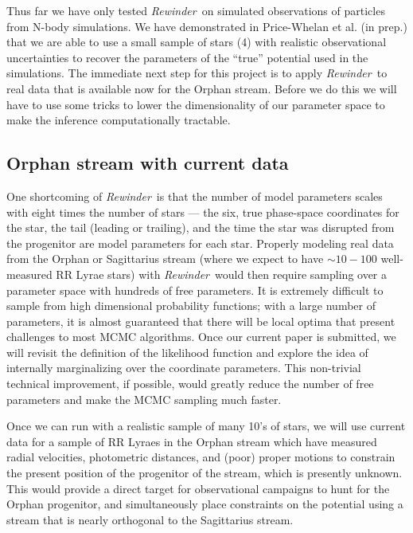 \documentclass[letterpaper,12pt,preprint]{aastex}
\newcommand{\rewinder}{\emph{Rewinder}}
\begin{document}
Thus far we have only tested \rewinder\ on simulated observations of particles from N-body simulations. We have demonstrated in Price-Whelan et al. (in prep.) that we are able to use a small sample of stars (4) with realistic observational uncertainties to recover the parameters of the ``true'' potential used in the simulations. The immediate next step for this project is to apply \rewinder\ to real data that is available now for the Orphan stream. Before we do this we will have to use some tricks to lower the dimensionality of our parameter space to make the inference computationally tractable.

\subsection{Orphan stream with current data}

One shortcoming of \rewinder\ is that the number of model parameters scales with eight times the number of stars --- the six, true phase-space coordinates for the star, the tail (leading or trailing), and the time the star was disrupted from the progenitor are model parameters for each star. Properly modeling real data from the Orphan or Sagittarius stream (where we expect to have $\sim10-100$ well-measured RR Lyrae stars) with \rewinder\ would then require sampling over a parameter space with hundreds of free parameters. It is extremely difficult to sample from high dimensional probability functions; with a large number of parameters, it is almost guaranteed that there will be local optima that present challenges to most MCMC algorithms. Once our current paper is submitted, we will revisit the definition of the likelihood function and explore the idea of internally marginalizing over the coordinate parameters. This non-trivial technical improvement, if possible, would greatly reduce the number of free parameters and make the MCMC sampling much faster. 

Once we can run with a realistic sample of many 10's of stars, we will use current data for a sample of RR Lyraes in the Orphan stream which have measured radial velocities, photometric distances, and (poor) proper motions to constrain the present position of the progenitor of the stream, which is presently unknown. This would provide a direct target for observational campaigns to hunt for the Orphan progenitor, and simultaneously place constraints on the potential using a stream that is nearly orthogonal to the Sagittarius stream.
\end{document}
